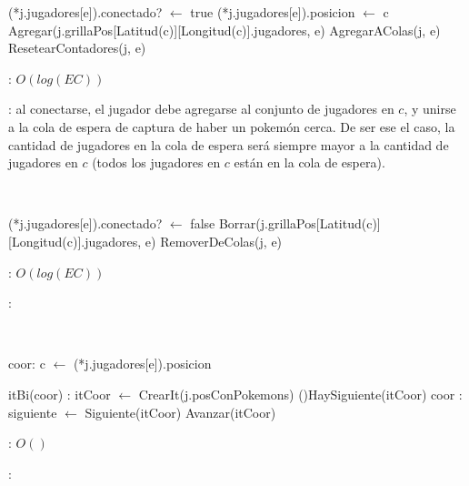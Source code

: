 \begin{Algoritmos}
	\begin{algorithm}[H]
		\NoCaptionOfAlgo
		\caption{}
		(*j.jugadores[e]).conectado? $\leftarrow$ true
		(*j.jugadores[e]).posicion $\leftarrow$ c
		Agregar(j.grillaPos[Latitud(c)][Longitud(c)].jugadores, e)\; %
		AgregarAColas(j, e)\; %
		ResetearContadores(j, e)\; %
	\end{algorithm}

	\complejidad: $O(log(EC))$

	\justifcomp: al conectarse, el jugador debe agregarse al conjunto de jugadores en $c$, y unirse a la cola de espera de captura de haber un pokemón cerca. De ser ese el caso, la cantidad de jugadores en la cola de espera será siempre mayor a la cantidad de jugadores en $c$ (todos los jugadores en $c$ están en la cola de espera).

	~

	\begin{algorithm}[H]
		\NoCaptionOfAlgo
		\caption{}
		(*j.jugadores[e]).conectado? $\leftarrow$ false
		Borrar(j.grillaPos[Latitud(c)][Longitud(c)].jugadores, e)\;
		RemoverDeColas(j, e)\; %
	\end{algorithm}

	\complejidad: $O(log(EC))$

	\justifcomp:

	~

	\begin{algorithm}[H]
		\NoCaptionOfAlgo
		\caption{}
		coor: c $\leftarrow$ (*j.jugadores[e]).posicion

		itBi(coor) : itCoor $\leftarrow$ CrearIt(j.posConPokemons)
		\While(){HaySiguiente(itCoor)}{
			coor : siguiente $\leftarrow$ Siguiente(itCoor)
			Avanzar(itCoor)
		}
	\end{algorithm}

	\complejidad: $O()$

	\justifcomp:


\end{Algoritmos}
